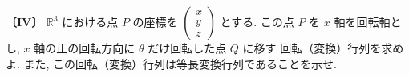 \noindent\textbf{〔IV〕}
$\mathbb{R}^3$ における点 $P$ の座標を $\begin{pmatrix}x\\y\\z\end{pmatrix}$ とする.
この点 $P$ を $x$ 軸を回転軸とし, $x$ 軸の正の回転方向に $\theta$ だけ回転した点 $Q$ に移す
回転（変換）行列を求めよ. また, この回転（変換）行列は等長変換行列であることを示せ.
